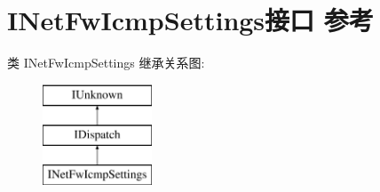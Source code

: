 \hypertarget{interface_i_net_fw_icmp_settings}{}\section{I\+Net\+Fw\+Icmp\+Settings接口 参考}
\label{interface_i_net_fw_icmp_settings}
类 I\+Net\+Fw\+Icmp\+Settings 继承关系图\+:\begin{figure}[H]
\begin{center}
\leavevmode
\includegraphics[height=3.000000cm]{interface_i_net_fw_icmp_settings}
\end{center}
\end{figure}
